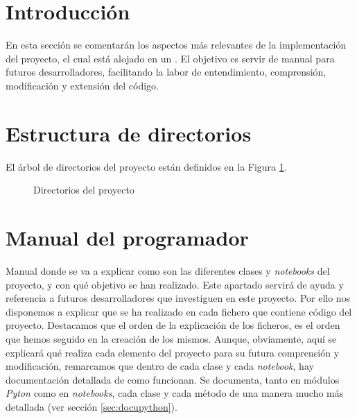 \section{Introducción}
En esta sección se comentarán los aspectos más relevantes de la implementación del proyecto, el cual está alojado en un . El objetivo es servir de manual para futuros desarrolladores, facilitando la labor de entendimiento, comprensión, modificación y extensión del código. 

\section{Estructura de directorios}\label{sec:estructura}
El árbol de directorios del proyecto están definidos en la Figura \ref{fig:dirtree}.
\begin{figure}
	\caption{Directorios del proyecto}
	\label{fig:dirtree}
\end{figure}


\section{Manual del programador}\label{sec:manualprog}
Manual donde se va a explicar como son las diferentes clases y \textit{notebooks} del proyecto, y con qué objetivo se han realizado. Este apartado servirá de ayuda y referencia a futuros desarrolladores que investiguen en este proyecto. Por ello nos disponemos a explicar que se ha realizado en cada fichero que contiene código del proyecto. Destacamos que el orden de la explicación de los ficheros, es el orden que hemos seguido en la creación de los mismos. Aunque, obviamente, aquí se explicará qué realiza cada elemento del proyecto para su futura comprensión y modificación, remarcamos que dentro de cada clase y cada \textit{notebook}, hay documentación detallada de como funcionan. Se documenta, tanto en módulos \textit{Pyton} como en \textit{notebooks}, cada clase y cada método de una manera mucho más detallada (ver sección \ref{sec:docupython}).


